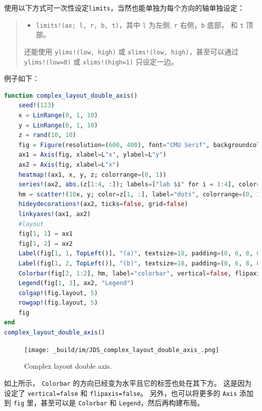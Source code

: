 \documentclass[
  notoc %
]{tufte-book}
\providecommand{\tightlist}{%
  \setlength{\itemsep}{0pt}\setlength{\parskip}{0pt}
}
\newcommand{\passthrough}[1]{#1}
\begin{document}
使用以下方式可一次性设定\passthrough{\lstinline!limits!}，当然也能单独为每个方向的轴单独设定：

\begin{quote}
\begin{itemize}
\tightlist
\item
  \passthrough{\lstinline"limits!(ax; l, r, b, t)"}，其中
  \passthrough{\lstinline!l!} 为左侧, \passthrough{\lstinline!r!}
  右侧，\passthrough{\lstinline!b!} 底部， 和
  \passthrough{\lstinline!t!} 顶部。
\end{itemize}

还能使用 \passthrough{\lstinline"ylims!(low, high)"} 或
\passthrough{\lstinline"xlims!(low, high)"}，甚至可以通过
\passthrough{\lstinline"ylims!(low=0)"} 或
\passthrough{\lstinline"xlims!(high=1)"} 只设定一边。
\end{quote}

例子如下：

\begin{lstlisting}[language=Julia]
function complex_layout_double_axis()
    seed!(123)
    x = LinRange(0, 1, 10)
    y = LinRange(0, 1, 10)
    z = rand(10, 10)
    fig = Figure(resolution=(600, 400), font="CMU Serif", backgroundcolor=:grey90)
    ax1 = Axis(fig, xlabel=L"x", ylabel=L"y")
    ax2 = Axis(fig, xlabel=L"x")
    heatmap!(ax1, x, y, z; colorrange=(0, 1))
    series!(ax2, abs.(z[1:4, :]); labels=["lab $i" for i = 1:4], color=:Set1_4)
    hm = scatter!(10x, y; color=z[1, :], label="dots", colorrange=(0, 1))
    hideydecorations!(ax2, ticks=false, grid=false)
    linkyaxes!(ax1, ax2)
    #layout
    fig[1, 1] = ax1
    fig[1, 2] = ax2
    Label(fig[1, 1, TopLeft()], "(a)", textsize=18, padding=(0, 6, 8, 0))
    Label(fig[1, 2, TopLeft()], "(b)", textsize=18, padding=(0, 6, 8, 0))
    Colorbar(fig[2, 1:2], hm, label="colorbar", vertical=false, flipaxis=false)
    Legend(fig[1, 3], ax2, "Legend")
    colgap!(fig.layout, 5)
    rowgap!(fig.layout, 5)
    fig
end
complex_layout_double_axis()
\end{lstlisting}

\begin{figure}
\hypertarget{fig:complex_layout_double_axis}{%
\centering
\texttt{[image: \_build/im/JDS\_complex\_layout\_double\_axis\_.png]}
\caption{Complex layout double
axis.}\label{fig:complex_layout_double_axis}
}
\end{figure}

如上所示， \passthrough{\lstinline!Colorbar!}
的方向已经变为水平且它的标签也处在其下方。 这是因为设定了
\passthrough{\lstinline!vertical=false!} 和
\passthrough{\lstinline!flipaxis=false!}。 另外，也可以将更多的
\passthrough{\lstinline!Axis!} 添加到 \passthrough{\lstinline!fig!}
里，甚至可以是 \passthrough{\lstinline!Colorbar!} 和
\passthrough{\lstinline!Legend!}，然后再构建布局。
\end{document}
